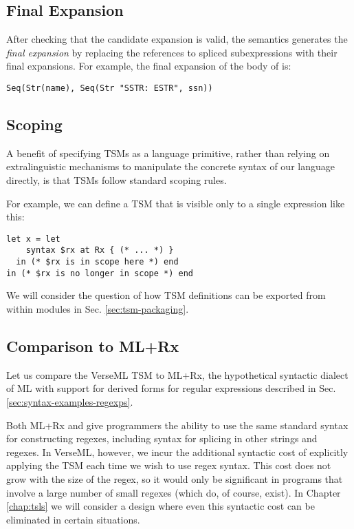 \subsection{Final Expansion}
After checking that the candidate expansion is {valid}, the semantics generates the \emph{final expansion} by replacing the references to spliced subexpressions with their final expansions. For example, the final expansion of the body of  is:
\begin{lstlisting}[numbers=none]
Seq(Str(name), Seq(Str "SSTR: ESTR", ssn))
\end{lstlisting}

\subsection{Scoping}
A benefit of specifying TSMs as a language primitive, rather than relying on extralinguistic mechanisms to manipulate the concrete syntax of our language directly, is that TSMs follow standard scoping rules. 

For example, we can define a TSM that is visible only to a single expression like this:
\begin{lstlisting}[numbers=none]
let x = let 
    syntax $rx at Rx { (* ... *) }
  in (* $rx is in scope here *) end 
in (* $rx is no longer in scope *) end
\end{lstlisting}

We will consider the question of how TSM definitions can be exported from within modules in Sec. \ref{sec:tsm-packaging}.

\subsection{Comparison to ML+Rx}
Let us compare the VerseML TSM  to ML+Rx, the hypothetical syntactic dialect of ML with support for derived forms for regular expressions described in Sec. \ref{sec:syntax-examples-regexps}.

Both ML+Rx and  give programmers the ability to use the same standard syntax for constructing regexes, including syntax for splicing in other strings and regexes. In VerseML, however, we incur the additional syntactic cost of explicitly applying the  TSM each time we wish to use regex syntax. This cost does not grow with the size of the regex, so it would only be significant in programs that involve a large number of small regexes (which do, of course, exist). In Chapter \ref{chap:tsls} we will consider a design where even this syntactic cost can be eliminated in certain situations.

